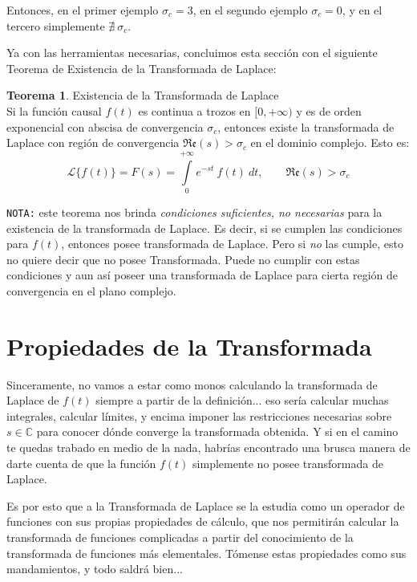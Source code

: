 \documentclass[12pt]{article}
\theoremstyle{definition}
\theoremstyle{theorem}
\newtheorem{theorem}{Teorema}[section]
\theoremstyle{corolary}
\theoremstyle{method}
\begin{document}
Entonces, en el primer ejemplo $\sigma_c=3$, en el segundo ejemplo $\sigma_c=0$, y en el tercero simplemente $\nexists\ \sigma_c$.

Ya con las herramientas necesarias, concluimos esta secci\'on con el siguiente Teorema de Existencia de la Transformada de Laplace:\\

\colorbox{orange!40!white!80}{\parbox{\linewidth}{
\theoremstyle{theorem}
\begin{theorem} {Existencia de la Transformada de Laplace}\\

Si la funci\'on causal $f(t)$ es continua a trozos en $[0, +\infty)$ y es de orden exponencial con abscisa de convergencia $\sigma_c$, entonces existe la transformada de Laplace con regi\'on de convergencia $\mathfrak{Re}(s)> \sigma_c$ en el dominio complejo. Esto es: $$\mathscr{L}\{f(t)\} = F(s) = \int\limits_0^{+\infty} e^{-st}\ f(t)\ dt, \qquad \mathfrak{Re}(s )> \sigma_c$$
\end{theorem}}}
\linebreak
\linebreak

\texttt{NOTA:} este teorema nos brinda \textit{condiciones suficientes, no necesarias} para la existencia de la transformada de Laplace. Es decir, si se cumplen las condiciones para $f(t)$, entonces posee transformada de Laplace. Pero si \textit{no} las cumple, esto no quiere decir que no posee Transformada. Puede no cumplir con estas condiciones y aun as\'i poseer una transformada de Laplace para cierta regi\'on de convergencia en el plano complejo.

\pagebreak
\section*{Propiedades de la Transformada}
Sinceramente, no vamos a estar como monos calculando la transformada de Laplace de $f(t)$ siempre a partir de la definici\'on... eso ser\'ia calcular muchas integrales, calcular l\'imites, y encima imponer las restricciones necesarias sobre $s\in \mathbb{C}$ para conocer d\'onde converge la transformada obtenida. Y si en el camino te quedas trabado en medio de la nada, habr\'ias encontrado una brusca manera de darte cuenta de que la funci\'on $f(t)$ simplemente no posee transformada de Laplace.

Es por esto que a la Transformada de Laplace se la estudia como un operador de funciones con sus propias propiedades de c\'alculo, que nos permitir\'an calcular la transformada de funciones complicadas a partir del conocimiento de la transformada de funciones m\'as elementales. T\'omense estas propiedades como sus mandamientos, y todo saldr\'a bien...\\
\end{document}

